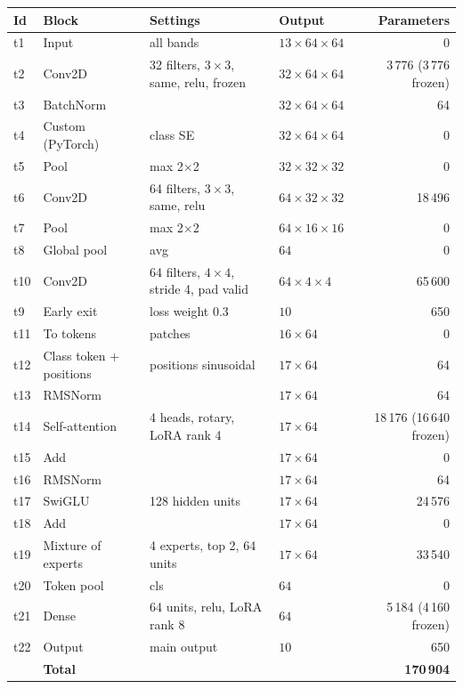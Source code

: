 {\small
\begin{longtable}{@{}lp{3.2cm}p{5.4cm}lr@{}}
\toprule
\textbf{Id} & \textbf{Block} & \textbf{Settings} & \textbf{Output} & \textbf{Parameters}\\
\midrule\endhead
t1 & Input & all bands & $13\times64\times64$ & 0\\
t2 & Conv2D & 32 filters, $3\times3$, same, relu, frozen & $32\times64\times64$ & 3\,776 (3\,776 frozen)\\
t3 & BatchNorm &  & $32\times64\times64$ & 64\\
t4 & Custom (PyTorch) & class SE & $32\times64\times64$ & 0\\
t5 & Pool & max 2$\times$2 & $32\times32\times32$ & 0\\
t6 & Conv2D & 64 filters, $3\times3$, same, relu & $64\times32\times32$ & 18\,496\\
t7 & Pool & max 2$\times$2 & $64\times16\times16$ & 0\\
t8 & Global pool & avg & $64$ & 0\\
t10 & Conv2D & 64 filters, $4\times4$, stride 4, pad valid & $64\times4\times4$ & 65\,600\\
t9 & Early exit & loss weight 0.3 & $10$ & 650\\
t11 & To tokens & patches & $16\times64$ & 0\\
t12 & Class token + positions & positions sinusoidal & $17\times64$ & 64\\
t13 & RMSNorm &  & $17\times64$ & 64\\
t14 & Self-attention & 4 heads, rotary, LoRA rank 4 & $17\times64$ & 18\,176 (16\,640 frozen)\\
t15 & Add &  & $17\times64$ & 0\\
t16 & RMSNorm &  & $17\times64$ & 64\\
t17 & SwiGLU & 128 hidden units & $17\times64$ & 24\,576\\
t18 & Add &  & $17\times64$ & 0\\
t19 & Mixture of experts & 4 experts, top 2, 64 units & $17\times64$ & 33\,540\\
t20 & Token pool & cls & $64$ & 0\\
t21 & Dense & 64 units, relu, LoRA rank 8 & $64$ & 5\,184 (4\,160 frozen)\\
t22 & Output & main output & $10$ & 650\\
\midrule
 & \textbf{Total} & & & \textbf{170\,904}\\
\bottomrule
\end{longtable}}

